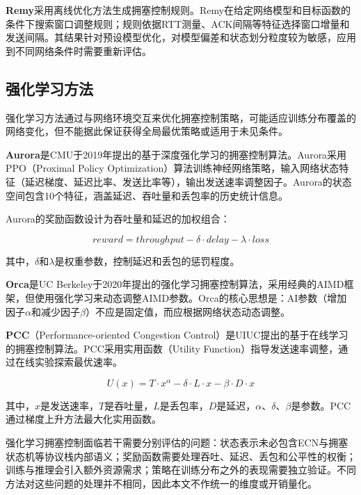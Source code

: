\textbf{Remy}采用离线优化方法生成拥塞控制规则。Remy在给定网络模型和目标函数的条件下搜索窗口调整规则；规则依据RTT测量、ACK间隔等特征选择窗口增量和发送间隔。其结果针对预设模型优化，对模型偏差和状态划分粒度较为敏感，应用到不同网络条件时需要重新评估。

\subsection{强化学习方法}

强化学习方法通过与网络环境交互来优化拥塞控制策略，可能适应训练分布覆盖的网络变化，但不能据此保证获得全局最优策略或适用于未见条件。

\textbf{Aurora}是CMU于2019年提出的基于深度强化学习的拥塞控制算法。Aurora采用PPO（Proximal Policy Optimization）算法训练神经网络策略，输入网络状态特征（延迟梯度、延迟比率、发送比率等），输出发送速率调整因子。Aurora的状态空间包含10个特征，涵盖延迟、吞吐量和丢包率的历史统计信息。

Aurora的奖励函数设计为吞吐量和延迟的加权组合：

\begin{equation}
reward = throughput - \delta \cdot delay - \lambda \cdot loss
\end{equation}

其中，$\delta$和$\lambda$是权重参数，控制延迟和丢包的惩罚程度。

\textbf{Orca}是UC Berkeley于2020年提出的强化学习拥塞控制算法，采用经典的AIMD框架，但使用强化学习来动态调整AIMD参数。Orca的核心思想是：AI参数（增加因子$\alpha$和减少因子$\beta$）不应是固定值，而应根据网络状态动态调整。

\textbf{PCC}（Performance-oriented Congestion Control）是UIUC提出的基于在线学习的拥塞控制算法。PCC采用实用函数（Utility Function）指导发送速率调整，通过在线实验探索最优速率。

\begin{equation}
U(x) = T \cdot x^{\alpha} - \delta \cdot L \cdot x - \beta \cdot D \cdot x
\end{equation}

其中，$x$是发送速率，$T$是吞吐量，$L$是丢包率，$D$是延迟，$\alpha$、$\delta$、$\beta$是参数。PCC通过梯度上升方法最大化实用函数。

强化学习拥塞控制面临若干需要分别评估的问题：状态表示未必包含ECN与拥塞状态机等协议栈内部语义；奖励函数需要处理吞吐、延迟、丢包和公平性的权衡；训练与推理会引入额外资源需求；策略在训练分布之外的表现需要独立验证。不同方法对这些问题的处理并不相同，因此本文不作统一的维度或开销量化。

